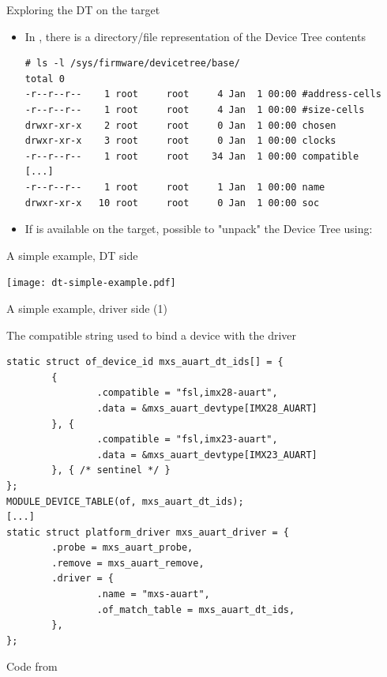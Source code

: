 \documentclass[obeyspaces,spaces,hyphens]{beamer}
\begin{document}
\begin{frame}[fragile]{Exploring the DT on the target}
  \begin{itemize}
  \item In , there is a
    directory/file representation of the Device Tree contents
{\footnotesize
    \begin{block}{}
\begin{verbatim}
# ls -l /sys/firmware/devicetree/base/
total 0
-r--r--r--    1 root     root     4 Jan  1 00:00 #address-cells
-r--r--r--    1 root     root     4 Jan  1 00:00 #size-cells
drwxr-xr-x    2 root     root     0 Jan  1 00:00 chosen
drwxr-xr-x    3 root     root     0 Jan  1 00:00 clocks
-r--r--r--    1 root     root    34 Jan  1 00:00 compatible
[...]
-r--r--r--    1 root     root     1 Jan  1 00:00 name
drwxr-xr-x   10 root     root     0 Jan  1 00:00 soc
\end{verbatim}
    \end{block}
}
  \item If  is available on the target, possible to "unpack"
    the Device Tree using:\\
  \end{itemize}
\end{frame}

\begin{frame}{A simple example, DT side}
  \begin{center}
    \texttt{[image: dt-simple-example.pdf]}
  \end{center}
\end{frame}

\begin{frame}[fragile]{A simple example, driver side (1)}
  \begin{block}{The compatible string used to bind a device with the driver}
    \begin{verbatim}
static struct of_device_id mxs_auart_dt_ids[] = {
        {
                .compatible = "fsl,imx28-auart",
                .data = &mxs_auart_devtype[IMX28_AUART]
        }, {
                .compatible = "fsl,imx23-auart",
                .data = &mxs_auart_devtype[IMX23_AUART]
        }, { /* sentinel */ }
};
MODULE_DEVICE_TABLE(of, mxs_auart_dt_ids);
[...]
static struct platform_driver mxs_auart_driver = {
        .probe = mxs_auart_probe,
        .remove = mxs_auart_remove,
        .driver = {
                .name = "mxs-auart",
                .of_match_table = mxs_auart_dt_ids,
        },
};
    \end{verbatim}
  \end{block}
  Code from 
\end{frame}
\end{document}
